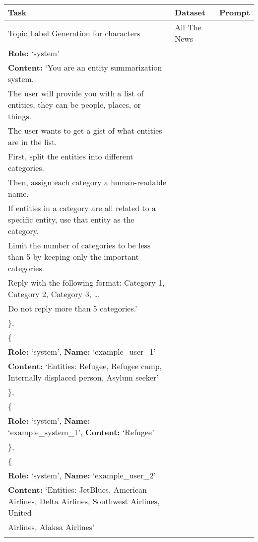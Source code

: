 \clearpage
\begin{center}
  \begin{tabular}{ | p{3.0cm} | p{3.0cm} | p{13cm} | }
    \hline
    \textbf{Task} & \textbf{Dataset} & \textbf{Prompt}\\
    \hline
    Topic Label Generation for characters & All The News & \makecell[tl]{
    \{\\
    \quad\textbf{Role:} `system'\\
    \quad\textbf{Content:} `You are an entity summarization system.\\
    \quad The user will provide you with a list of entities, they can be people, places, or things.\\
    \quad The user wants to get a gist of what entities are in the list.\\
    \quad First, split the entities into different categories.\\
    \quad Then, assign each category a human-readable name.\\
    \quad If entities in a category are all related to a specific entity, use that entity as the category.\\
    \quad Limit the number of categories to be less than 5 by keeping only the important categories. \\
    \quad Reply with the following format: Category 1, Category 2, Category 3, \dots \\
    \quad Do not reply more than 5 categories.'\\
    \},\\
    \{\\
    \quad\textbf{Role:} `system', \textbf{Name:} `example\_user\_1'\\ 
    \quad\textbf{Content:} `Entities: Refugee, Refugee camp, Internally displaced person, Asylum seeker'\\
    \}, \\
    \{\\
    \quad\textbf{Role:} `system', \textbf{Name:} `example\_system\_1', \textbf{Content:} `Refugee'\\
    \},\\
    \{\\
    \quad\textbf{Role:} `system', \textbf{Name:} `example\_user\_2'\\ 
    \quad\textbf{Content:} `Entities: JetBlues, American Airlines, Delta Airlines, Southwest Airlines, United\\
    \quad Airlines, Alaksa Airlines'\\
}
\end{tabular}
\end{center}
